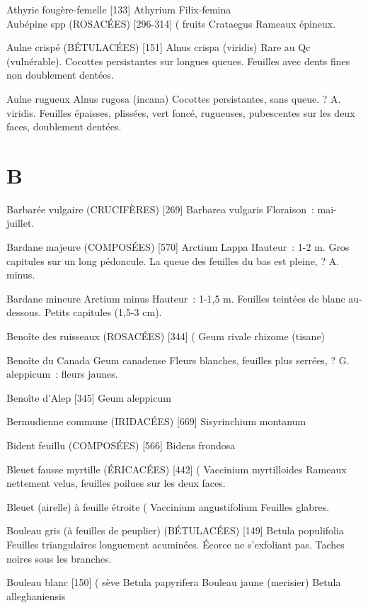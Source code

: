 Athyrie fougère-femelle  [133]
				Athyrium Filix-femina\\

Aubépine spp (ROSACÉES)  [296-314]				( fruits
				Crataegus
Rameaux épineux.

Aulne crispé (BÉTULACÉES)  [151]
				Alnus crispa (viridis)
Rare au Qc (vulnérable). Cocottes persistantes sur longues queues.
Feuilles avec dents fines non doublement dentées.

Aulne rugueux
				Alnus rugosa (incana)
Cocottes persistantes, sans queue. ? A. viridis.
Feuilles épaisses, plissées, vert foncé, rugueuses, pubescentes sur les deux faces, doublement dentées.
\chapter*{B}

Barbarée vulgaire (CRUCIFÈRES)  [269]
				Barbarea vulgaris
Floraison : mai-juillet.

Bardane majeure (COMPOSÉES)  [570]
				Arctium Lappa
Hauteur : 1-2 m. Gros capitules sur un long pédoncule. La queue des feuilles du bas est pleine, ? A. minus.

Bardane mineure
				Arctium minus
Hauteur : 1-1,5 m. Feuilles teintées de blanc au-dessous. Petits capitules (1,5-3 cm).

Benoîte des ruisseaux (ROSACÉES)  [344]			(
				Geum rivale			rhizome (tisane)

Benoîte du Canada
				Geum canadense
Fleurs blanches, feuilles plus serrées, ? G. aleppicum : fleurs jaunes.


Benoîte d’Alep  [345]
				Geum aleppicum

Bermudienne commune (IRIDACÉES)  [669]
				Sisyrinchium montanum

Bident feuillu (COMPOSÉES)  [566]
				Bidens frondosa

Bleuet fausse myrtille (ÉRICACÉES)  [442]			(
				Vaccinium myrtilloides
Rameaux nettement velus, feuilles poilues sur les deux faces.

Bleuet (airelle) à feuille étroite					(
				Vaccinium angustifolium
Feuilles glabres.

Bouleau gris (à feuilles de peuplier) (BÉTULACÉES) [149]
				Betula populifolia
Feuilles triangulaires longuement acuminées.
Écorce ne s’exfoliant pas.
Taches noires sous les branches.

Bouleau blanc  [150]							( sève
				Betula papyrifera
Bouleau jaune (merisier)
				Betula alleghaniensis

